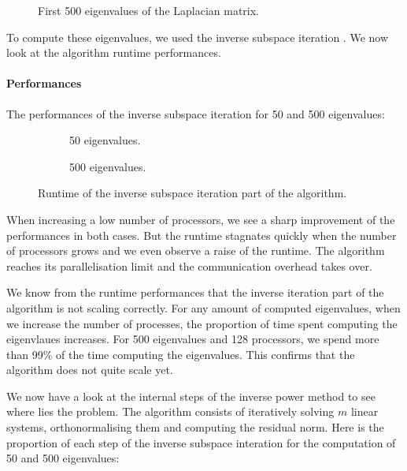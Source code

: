 \begin{figure}[H]
  \centering
  
  \caption{First 500 eigenvalues of the Laplacian matrix.}
\end{figure}

To compute these eigenvalues, we used the inverse subspace iteration \cite{el_khoury_acceleration_2014}.
We now look at the algorithm runtime performances.

\paragraph{Performances}
The performances of the inverse subspace iteration for 50 and 500 eigenvalues:

\begin{figure}[H]
  \centering
  \begin{subfigure}[b]{0.4\textwidth}
   
   \caption{50 eigenvalues.}
  \end{subfigure}
  \begin{subfigure}[b]{0.4\textwidth}
   
   \caption{500 eigenvalues.}
  \end{subfigure}
  \caption{Runtime of the inverse subspace iteration part of the algorithm.}
\end{figure}

When increasing a low number of processors, we see a sharp improvement of the performances in both cases.
But the runtime stagnates quickly when the number of processors grows and we even observe a raise of the runtime.
The algorithm reaches its parallelisation limit and the communication overhead takes over.

We know from the runtime performances that the inverse iteration part of the algorithm is not scaling correctly.
For any amount of computed eigenvalues, when we increase the number of processes, the proportion of time spent computing the eigenvlaues increases.
For 500 eigenvalues and 128 processors, we spend more than 99\% of the time computing the eigenvalues.
This confirms that the algorithm does not quite scale yet.

We now have a look at the internal steps of the inverse power method to see where lies the problem.
The algorithm consists of iteratively solving \(m\) linear systems, orthonormalising them and computing the residual norm.
Here is the proportion of each step of the inverse subspace interation for the computation of 50 and 500 eigenvalues:


